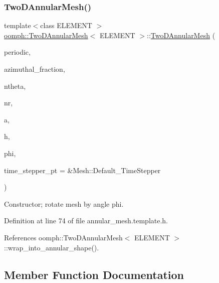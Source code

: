 \subsubsection{\texorpdfstring{Two\+D\+Annular\+Mesh()}{TwoDAnnularMesh()}\hspace{0.1cm}{\footnotesize\ttfamily [2/2]}}
{\footnotesize\ttfamily template$<$class E\+L\+E\+M\+E\+NT $>$ \\
\hyperlink{classoomph_1_1TwoDAnnularMesh}{oomph\+::\+Two\+D\+Annular\+Mesh}$<$ E\+L\+E\+M\+E\+NT $>$\+::\hyperlink{classoomph_1_1TwoDAnnularMesh}{Two\+D\+Annular\+Mesh} (\begin{DoxyParamCaption}\item[{const bool \&}]{periodic,  }\item[{const double \&}]{azimuthal\+\_\+fraction,  }\item[{const unsigned \&}]{ntheta,  }\item[{const unsigned \&}]{nr,  }\item[{const double \&}]{a,  }\item[{const double \&}]{h,  }\item[{const double \&}]{phi,  }\item[{Time\+Stepper $\ast$}]{time\+\_\+stepper\+\_\+pt = {\ttfamily \&Mesh\+:\+:Default\+\_\+TimeStepper} }\end{DoxyParamCaption})\hspace{0.3cm}{\ttfamily [inline]}}



Constructor; rotate mesh by angle phi. 



Definition at line 74 of file annular\+\_\+mesh.\+template.\+h.



References oomph\+::\+Two\+D\+Annular\+Mesh$<$ E\+L\+E\+M\+E\+N\+T $>$\+::wrap\+\_\+into\+\_\+annular\+\_\+shape().



\subsection{Member Function Documentation}
\mbox{\label{classoomph_1_1TwoDAnnularMesh_adcf4ce1aefcce7a773c66ff0f496df9e}} 
